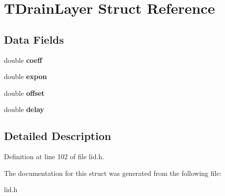\hypertarget{struct_t_drain_layer}{}\section{T\+Drain\+Layer Struct Reference}
\label{struct_t_drain_layer}
\subsection*{Data Fields}
\begin{DoxyCompactItemize}
\item 
\mbox{\label{struct_t_drain_layer_aa8c8f49390c3cf7c702d71a71bc977e3}} 
double {\bfseries coeff}
\item 
\mbox{\label{struct_t_drain_layer_aef7e4f438c6d6b4ddc83ee2347e8c28a}} 
double {\bfseries expon}
\item 
\mbox{\label{struct_t_drain_layer_a129303e4bd38a8cdba722b6238ed56e9}} 
double {\bfseries offset}
\item 
\mbox{\label{struct_t_drain_layer_a0bf98c9ae4eac6da250cb1e2fac20365}} 
double {\bfseries delay}
\end{DoxyCompactItemize}


\subsection{Detailed Description}


Definition at line 102 of file lid.\+h.



The documentation for this struct was generated from the following file\+:\begin{DoxyCompactItemize}
\item 
lid.\+h\end{DoxyCompactItemize}

